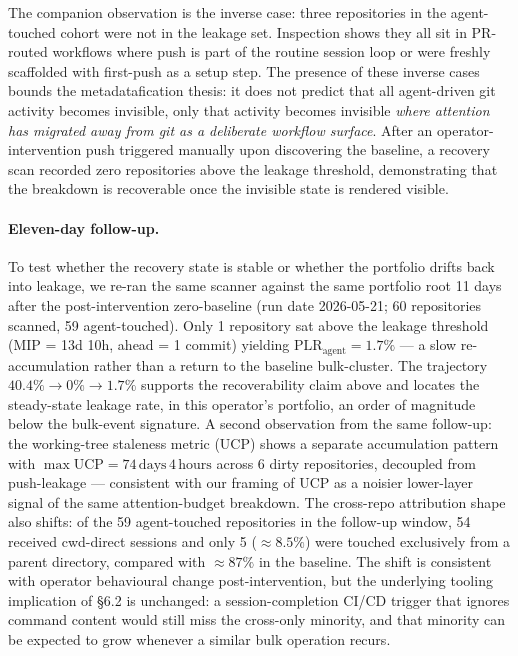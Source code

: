 \documentclass[12pt]{article}
\begin{document}
The companion observation is the inverse case: three repositories in the agent-touched cohort were not in the leakage set. Inspection shows they all sit in PR-routed workflows where push is part of the routine session loop or were freshly scaffolded with first-push as a setup step. The presence of these inverse cases bounds the metadatafication thesis: it does not predict that all agent-driven git activity becomes invisible, only that activity becomes invisible \textit{where attention has migrated away from git as a deliberate workflow surface}. After an operator-intervention push triggered manually upon discovering the baseline, a recovery scan recorded zero repositories above the leakage threshold, demonstrating that the breakdown is recoverable once the invisible state is rendered visible.

\paragraph{Eleven-day follow-up.}
To test whether the recovery state is stable or whether the portfolio drifts back into leakage, we re-ran the same scanner against the same portfolio root 11 days after the post-intervention zero-baseline (run date 2026-05-21; 60 repositories scanned, 59 agent-touched). Only 1 repository sat above the leakage threshold (MIP = 13d 10h, ahead = 1 commit) yielding $\textrm{PLR}_\text{agent}=1.7\%$ --- a slow re-accumulation rather than a return to the baseline bulk-cluster. The trajectory $40.4\% \to 0\% \to 1.7\%$ supports the recoverability claim above and locates the steady-state leakage rate, in this operator's portfolio, an order of magnitude below the bulk-event signature. A second observation from the same follow-up: the working-tree staleness metric (UCP) shows a separate accumulation pattern with $\max\textrm{UCP}=74\,\text{days}\,4\,\text{hours}$ across 6 dirty repositories, decoupled from push-leakage --- consistent with our framing of UCP as a noisier lower-layer signal of the same attention-budget breakdown. The cross-repo attribution shape also shifts: of the 59 agent-touched repositories in the follow-up window, 54 received cwd-direct sessions and only 5 ($\approx 8.5\%$) were touched exclusively from a parent directory, compared with $\approx 87\%$ in the baseline. The shift is consistent with operator behavioural change post-intervention, but the underlying tooling implication of \S6.2 is unchanged: a session-completion CI/CD trigger that ignores command content would still miss the cross-only minority, and that minority can be expected to grow whenever a similar bulk operation recurs.
\end{document}
